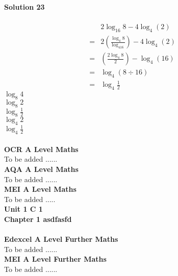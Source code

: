 \documentclass{article}
\begin{document}
\noindent\textbf{Solution 23}\\[2pt]
\\[-10pt]\begin{align*}
&2\log_{16}8-4\log_{4}(2)\\[2pt]
=&2\left(\displaystyle\frac{\log_{4}8}{\log_416}\right)-4\log_{4}(2)\\[2pt]
=&\left(\displaystyle\frac{2\log_{4}8}{2}\right)-\log_{4}(16)\\[2pt]
=&\log_{4}(8 \div 16)\\[2pt]
=&\log_{4}\displaystyle\frac{1}{2}
\end{align*}
$\log_{8}4$\\
$\log_{8}2$\\
$\log_{8}\displaystyle\frac{1}{2}$\\
$\log_{4}2$\\
$\log_{4}\displaystyle\frac{1}{2}$\\
\\[2pt]
\noindent\Huge{\textbf{OCR A Level Maths}}\\[5pt]
\noindent\large{To be added ......}\\[20pt]
\noindent\Huge{\textbf{AQA A Level Maths}}\\[5pt]
\noindent\large{To be added ......}\\[20pt]
\noindent\Huge{\textbf{MEI A Level Maths}}\\[5pt]
\noindent\large{To be added .....}\\[20pt]
\noindent\huge{\textbf{Unit 1 C 1}}\\[18pt]
\noindent\huge{\textbf{Chapter 1 asdfasfd}}\\[15pt]
\\[2pt]
\noindent\Huge{\textbf{Edexcel A Level Further Maths}}\\[5pt]
\noindent\large{To be added ......}\\[20pt]
\noindent\Huge{\textbf{MEI A Level Further Maths}}\\[5pt]
\noindent\large{To be added ......}\\[20pt]
\end{document}
